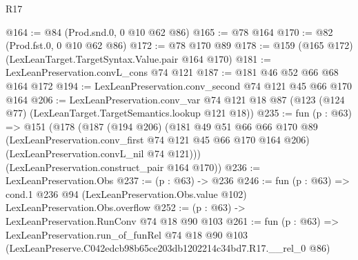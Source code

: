 \begin{lexlean}{R17}
\begin{coremodule}
@164 := @84 (Prod.snd.{0, 0} @10 @62 @86)
@165 := @78 @164
@170 := @82 (Prod.fst.{0, 0} @10 @62 @86)
@172 := @78 @170 @89
@178 := @159 (@165 @172) (LexLeanTarget.TargetSyntax.Value.pair @164 @170)
@181 := LexLeanPreservation.convL_cons @74 @121
@187 := @181 @46 @52 @66 @68 @164 @172
@194 := LexLeanPreservation.conv_second @74 @121 @45 @66 @170 @164
@206 := LexLeanPreservation.conv_var
    @74
    @121
    @18
    @87
    (@123 (@124 @77) (LexLeanTarget.TargetSemantics.lookup @121 @18))
@235 := fun (p : @63) =>
  @151
    (@178
      (@187
        (@194 @206)
        (@181
          @49
          @51
          @66
          @66
          @170
          @89
          (LexLeanPreservation.conv_first @74 @121 @45 @66 @170 @164 @206)
          (LexLeanPreservation.convL_nil @74 @121)))
      (LexLeanPreservation.construct_pair @164 @170))
@236 := LexLeanPreservation.Obs
@237 := (p : @63) -> @236
@246 := fun (p : @63) =>
  cond.{1} @236 @94 (LexLeanPreservation.Obs.value @102) LexLeanPreservation.Obs.overflow
@252 := (p : @63) -> LexLeanPreservation.RunConv @74 @18 @90 @103
@261 := fun (p : @63) =>
  LexLeanPreservation.run_of_funRel
    @74
    @18
    @90
    @103
    (LexLeanPreserve.C042edcb98b65ce203db1202214c34bd7.R17.__rel_0 @86)
\end{coremodule}
\end{lexlean}

